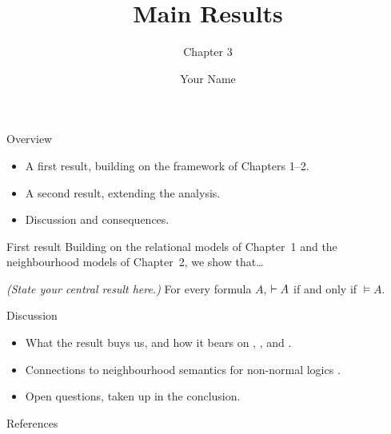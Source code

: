 \documentclass{beamer}
\title{Main Results}
\subtitle{Chapter 3}
\author{Your Name}
\institute{Your Department \\ University of California, Davis}
\date{}
\begin{document}
\frame{\titlepage}

\begin{frame}{Overview}
  \begin{itemize}
    \item A first result, building on the framework of Chapters 1--2.
    \item A second result, extending the analysis.
    \item Discussion and consequences.
  \end{itemize}
\end{frame}

\begin{frame}{First result}
  Building on the relational models \MRel{} of Chapter~1 and the neighbourhood
  models \MN{} of Chapter~2, we show that\dots
  \begin{theorem}
    \emph{(State your central result here.)}  For every formula $A$,
    $\vdash A$ if and only if $\models A$.
  \end{theorem}
\end{frame}

\begin{frame}{Discussion}
  \begin{itemize}
    \item What the result buys us, and how it bears on \K, \KT, and \Sfour.
    \item Connections to neighbourhood semantics for non-normal logics
      \parencite{pacuit2017}.
    \item Open questions, taken up in the conclusion.
  \end{itemize}
\end{frame}

\begin{frame}[allowframebreaks]{References}
  \printbibliography
\end{frame}
\end{document}
